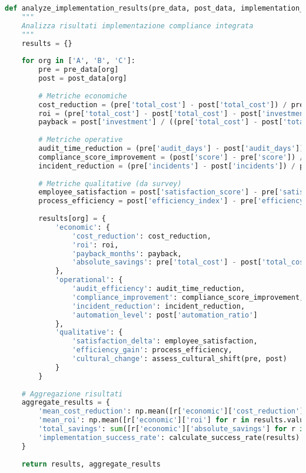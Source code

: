 \begin{lstlisting}[language=Python, caption=Analisi risultati implementazione]
def analyze_implementation_results(pre_data, post_data, implementation_period=18):
    """
    Analizza risultati implementazione compliance integrata
    """
    results = {}
    
    for org in ['A', 'B', 'C']:
        pre = pre_data[org]
        post = post_data[org]
        
        # Metriche economiche
        cost_reduction = (pre['total_cost'] - post['total_cost']) / pre['total_cost']
        roi = (pre['total_cost'] - post['total_cost'] - post['investment']) / post['investment']
        payback = post['investment'] / ((pre['total_cost'] - post['total_cost']) / 12)
        
        # Metriche operative
        audit_time_reduction = (pre['audit_days'] - post['audit_days']) / pre['audit_days']
        compliance_score_improvement = (post['score'] - pre['score']) / pre['score']
        incident_reduction = (pre['incidents'] - post['incidents']) / pre['incidents']
        
        # Metriche qualitative (da survey)
        employee_satisfaction = post['satisfaction_score'] - pre['satisfaction_score']
        process_efficiency = post['efficiency_index'] - pre['efficiency_index']
        
        results[org] = {
            'economic': {
                'cost_reduction': cost_reduction,
                'roi': roi,
                'payback_months': payback,
                'absolute_savings': pre['total_cost'] - post['total_cost']
            },
            'operational': {
                'audit_efficiency': audit_time_reduction,
                'compliance_improvement': compliance_score_improvement,
                'incident_reduction': incident_reduction,
                'automation_level': post['automation_ratio']
            },
            'qualitative': {
                'satisfaction_delta': employee_satisfaction,
                'efficiency_gain': process_efficiency,
                'cultural_change': assess_cultural_shift(pre, post)
            }
        }
        
    # Aggregazione risultati
    aggregate_results = {
        'mean_cost_reduction': np.mean([r['economic']['cost_reduction'] for r in results.values()]),
        'mean_roi': np.mean([r['economic']['roi'] for r in results.values()]),
        'total_savings': sum([r['economic']['absolute_savings'] for r in results.values()]),
        'implementation_success_rate': calculate_success_rate(results)
    }
    
    return results, aggregate_results
\end{lstlisting}

